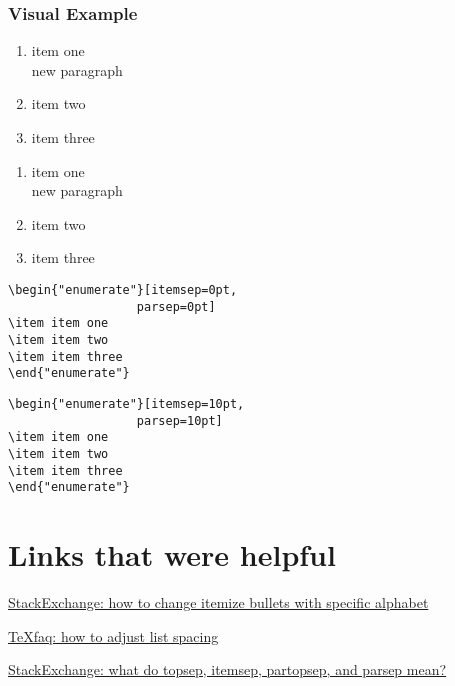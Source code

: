 \documentclass[12pt, letterpaper]{article}
\begin{document}
\subsubsection{Visual Example}
\begin{multicols}{2}
\begin{enumerate}[itemsep=0pt, parsep=0pt]
	\item item one\\
	new paragraph 
	\item item two
	\item item three
\end{enumerate} 
\columnbreak 
\begin{enumerate}[itemsep=10pt, parsep=10pt]
	\item item one\\
	new paragraph 
	\item item two
	\item item three
\end{enumerate} 
\end{multicols}
\begin{multicols}{2}
\begin{lstlisting}
\begin{"enumerate"}[itemsep=0pt,
                  parsep=0pt]
\item item one
\item item two
\item item three
\end{"enumerate"} 
\end{lstlisting}
	\columnbreak 
\begin{lstlisting}
\begin{"enumerate"}[itemsep=10pt, 
                  parsep=10pt]
\item item one
\item item two
\item item three
\end{"enumerate"} 
\end{lstlisting}
\end{multicols}


\section{Links that were helpful} 
\href{https://tex.stackexchange.com/questions/278877/how-to-change-itemize-bullets-with-specific-alphabet}{StackExchange: how to change itemize bullets with specific alphabet} 

\href{https://texfaq.org/FAQ-complist}{TeXfaq: how to adjust list spacing}

\href{https://tex.stackexchange.com/questions/300340/topsep-itemsep-partopsep-and-parsep-what-does-each-of-them-mean-and-wha}{StackExchange: what do topsep, itemsep, partopsep, and parsep mean?}
\end{document}
